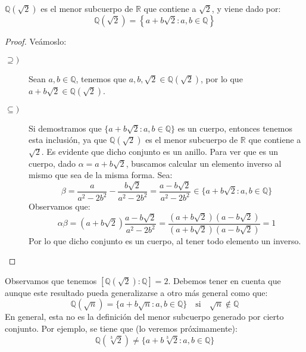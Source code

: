 \begin{ejemplo}
    $\mathbb{Q}(\sqrt{2})$ es el menor subcuerpo de $\mathbb{R}$ que contiene a $\sqrt{2}$, y viene dado por:
    \begin{equation*}
        \mathbb{Q}(\sqrt{2}) = \left\{a+b\sqrt{2} : a,b\in \mathbb{Q}\right\}
    \end{equation*}
    \begin{proof}
        Veámoslo:
        \begin{description}
            \item [$\supseteq)$] Sean $a,b\in \mathbb{Q}$, tenemos que $a,b,\sqrt{2}\in \mathbb{Q}(\sqrt{2})$, por lo que $a+b\sqrt{2}\in \mathbb{Q}(\sqrt{2})$.
            \item [$\subseteq)$] Si demostramos que $\{a+b\sqrt{2}:a,b\in \mathbb{Q}\}$ es un cuerpo, entonces tenemos esta inclusión, ya que $\mathbb{Q}(\sqrt{2})$ es el menor subcuerpo de $\mathbb{R}$ que contiene a $\sqrt{2}$. Es evidente que dicho conjunto es un anillo. Para ver que es un cuerpo, dado $\alpha=a+b\sqrt{2}$, buscamos calcular un elemento inverso al mismo que sea de la misma forma. Sea:
                \begin{equation*}
                \beta = \dfrac{a}{a^2-2b^2} - \dfrac{b\sqrt{2}}{a^2-2b^2} = \dfrac{a-b\sqrt{2}}{a^2-2b^2} \in \{a+b\sqrt{2}:a,b\in \mathbb{Q}\}
                \end{equation*}
                Observamos que:
                \begin{equation*}
                    \alpha \beta = \left(a+b\sqrt{2}\right) \dfrac{a-b\sqrt{2}}{a^2-2b^2} = \dfrac{\left(a+b\sqrt{2}\right)\left(a-b\sqrt{2}\right)}{\left(a+b\sqrt{2}\right)\left(a-b\sqrt{2}\right)} = 1
                \end{equation*}
                Por lo que dicho conjunto es un cuerpo, al tener todo elemento un inverso.
        \end{description}
    \end{proof}
    \noindent
    Observamos que tenemos $\left[\mathbb{Q}(\sqrt{2}): \mathbb{Q}\right] = 2$. Debemos tener en cuenta que aunque este resultado pueda generalizarse a otro más general como que:
    \begin{equation*}
        \mathbb{Q}(\sqrt{n}) = \{a+b\sqrt{n}:a,b\in \mathbb{Q}\} \quad \text{si}\quad  \sqrt{n}\notin \mathbb{Q}
    \end{equation*}
    En general, esta no es la definición del menor subcuerpo generado por cierto conjunto. Por ejemplo, se tiene que (lo veremos próximamente):
    \begin{equation*}
        \mathbb{Q}\left(\sqrt[3]{2}\right) \neq \{a+b\sqrt[3]{2}:a,b\in \mathbb{Q}\}
    \end{equation*}
\end{ejemplo}

